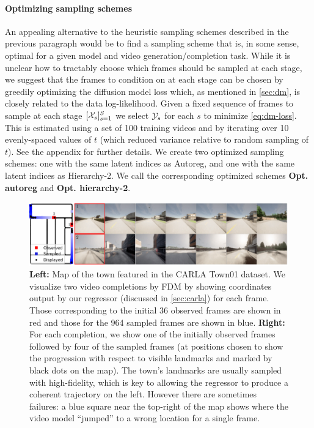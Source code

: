 \paragraph{Optimizing sampling schemes}
An appealing alternative to the heuristic sampling schemes described in the previous paragraph would be to find a sampling scheme that is, in some sense, optimal for a given model and video generation/completion task. While it is unclear how to tractably choose which frames should be sampled at each stage, we suggest that the frames to condition on at each stage can be chosen by greedily optimizing the diffusion model loss which, as mentioned in \cref{sec:dm}, is closely related to the data log-likelihood. Given a fixed sequence of frames to sample at each stage $[\mathcal{X}_s]_{s=1}^S$ we select $\mathcal{Y}_s$ for each $s$ to minimize \cref{eq:dm-loss}. This is estimated using a set of 100 training videos and by iterating over 10 evenly-spaced values of $t$ (which reduced variance relative to random sampling of $t$). See the appendix for further details. We create two optimized sampling schemes: one with the same latent indices as Autoreg, and one with the same latent indices as Hierarchy-2. We call the corresponding optimized schemes \textbf{Opt. autoreg} and \textbf{Opt. hierarchy-2}.


\begin{figure}
    \centering
    \includegraphics[width=1\textwidth]{figs/fdm/carla_map_7panel}
    \caption{\textbf{Left:} Map of the town featured in the CARLA Town01 dataset. We visualize two video completions by FDM by showing coordinates output by our regressor (discussed in \cref{sec:carla}) for each frame. Those corresponding to the initial 36 observed frames are shown in red and those for the 964 sampled frames are shown in blue. \textbf{Right:} For each completion, we show one of the initially observed frames followed by four of the sampled frames (at positions chosen to show the progression with respect to visible landmarks and marked by black dots on the map). The town's landmarks are usually sampled with high-fidelity, which is key to allowing the regressor  to produce a coherent trajectory on the left. However there are sometimes failures: a blue square near the top-right of the map shows where the video model ``jumped'' to a wrong location for a single frame.}
    \label{fig:carla}
\end{figure}


